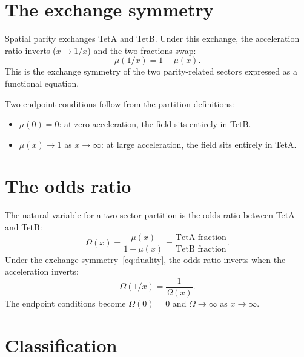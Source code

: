 \documentclass[twocolumn]{iopjournal}
\begin{document}

\section*{The exchange symmetry}

Spatial parity exchanges TetA and TetB. Under this exchange,
the acceleration ratio inverts ($x \to 1/x$) and the two
fractions swap:
\begin{equation}
  \mu(1/x) = 1 - \mu(x).
  \label{eq:duality}
\end{equation}
This is the exchange symmetry of the two parity-related
sectors expressed as a functional equation.

Two endpoint conditions follow from the partition definitions:
\begin{itemize}
\item $\mu(0) = 0$: at zero acceleration, the field sits
  entirely in TetB.
\item $\mu(x) \to 1$ as $x \to \infty$: at large
  acceleration, the field sits entirely in TetA.
\end{itemize}


\section*{The odds ratio}

The natural variable for a two-sector partition is the odds
ratio between TetA and TetB:
\begin{equation}
  \Omega(x) = \frac{\mu(x)}{1 - \mu(x)}
  = \frac{\text{TetA fraction}}{\text{TetB fraction}}.
  \label{eq:odds}
\end{equation}
Under the exchange symmetry~\eqref{eq:duality}, the odds
ratio inverts when the acceleration inverts:
\begin{equation}
  \Omega(1/x) = \frac{1}{\Omega(x)}.
  \label{eq:odds_duality}
\end{equation}
The endpoint conditions become $\Omega(0) = 0$ and
$\Omega \to \infty$ as $x \to \infty$.


\section*{Classification}
\end{document}
